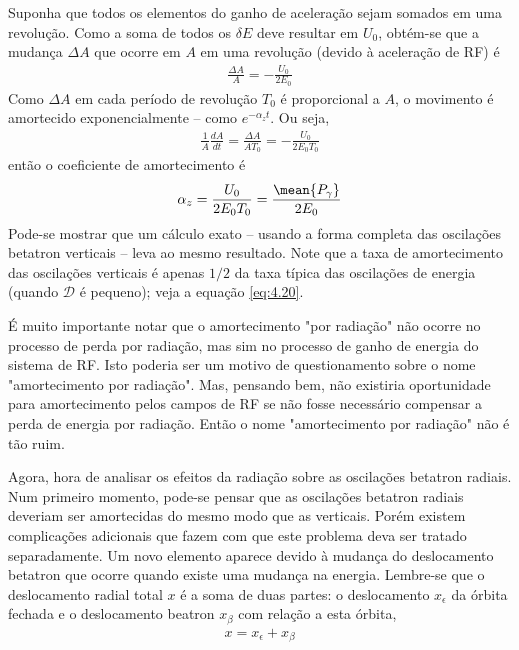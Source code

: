 Suponha que todos os elementos do ganho de aceleração sejam somados em uma revolução. Como a soma de todos os $\delta E$ deve resultar em $U_0$, obtém-se que a mudança $\Delta A$ que ocorre em $A$ em uma revolução (devido à aceleração de RF) é
\begin{align}
	\frac{\Delta A}{A} = -\frac{U_0}{2E_0}\label{eq:4.30}
\end{align}
Como $\Delta A$ em cada período de revolução $T_0$ é proporcional a $A$, o movimento é amortecido exponencialmente -- como $e^{-\alpha_z t}$. Ou seja,
\begin{align}
	\frac{1}{A}\frac{dA}{dt} = \frac{\Delta A}{A T_0} = -\frac{U_0}{2E_0T_0}
\end{align}
então o coeficiente de amortecimento é
\begin{align}
	\alpha_z = \frac{U_0}{2E_0T_0} = \frac{\mean{P_\gamma}}{2E_0}
\end{align}
Pode-se mostrar que um cálculo exato -- usando a forma completa das oscilações betatron verticais -- leva ao mesmo resultado. Note que a taxa de amortecimento das oscilações verticais é apenas $1/2$ da taxa típica das oscilações de energia (quando $\mathscr{D}$ é pequeno); veja a equação \eqref{eq:4.20}.

É muito importante notar que o amortecimento "por radiação" não ocorre no processo de perda por radiação, mas sim no processo de ganho de energia do sistema de RF. Isto poderia ser um motivo de questionamento sobre o nome "amortecimento por radiação". Mas, pensando bem, não existiria oportunidade para amortecimento pelos campos de RF se não fosse necessário compensar a perda de energia por radiação. Então o nome "amortecimento por radiação" não é tão ruim.

Agora, hora de analisar os efeitos da radiação sobre as oscilações betatron radiais. Num primeiro momento, pode-se pensar que as oscilações betatron radiais deveriam ser amortecidas do mesmo modo que as verticais. Porém existem complicações adicionais que fazem com que este problema deva ser tratado separadamente. Um novo elemento aparece devido à mudança do deslocamento betatron que ocorre quando existe uma mudança na energia. Lembre-se que o deslocamento radial total $x$ é a soma de duas partes: o deslocamento $x_\epsilon$ da órbita fechada e o deslocamento beatron $x_\beta$ com relação a esta órbita,
\begin{align}
	x = x_\epsilon + x_\beta\label{eq:4.33}
\end{align}

